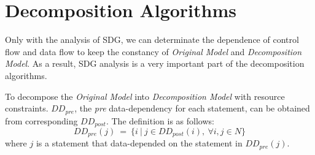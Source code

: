 \section{Decomposition Algorithms}
Only with the analysis of SDG, we can determinate the dependence of control flow and data flow to keep the constancy of \emph{Original Model} and \emph{Decomposition Model}. As a result, SDG analysis is a very important part of the decomposition algorithms.

To decompose the \emph{Original Model} into \emph{Decomposition Model} with resource constraints. $DD_{pre}$, the \emph{pre} data-dependency for each statement, can be obtained from corresponding $DD_{post}$. The definition is as follows:
\begin{displaymath}
    DD_{pre}(j) \ = \ \{ i \ | \ j \in DD_{post}(i), \ \forall i, j \in N \}
\end{displaymath}
where $j$ is a statement that data-depended on the statement in $DD_{pre}(j)$.
